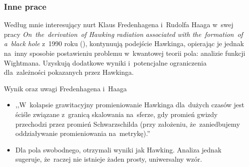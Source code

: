 \documentclass{beamer}  %
\begin{document}
\begin{frame}
  \frametitle{Inne prace}

  \begin{block}{Według mnie interesujący nurt}
    Klaus Fredenhagena i~Rudolfa Haaga w~swej pracy
    \emph{On~the~derivation~of Hawking radiation associated with
      the~formation~of a~black hole} z~1990 roku
    (\cite{FredenhagenHaagDerivationOfHawkingRadiation1990}),
    kontynuują podejście Hawkinga, opierając je jednak na~inny
    sposobie postawieniu problemu w~kwantowej teorii pola: analizie
    funkcji Wightmana. Uzyskują dodatkowe wyniki i~potencjalne
    ograniczenia dla~zależności pokazanych przez Hawkinga.
  \end{block}

  \begin{block}{Wynik oraz uwagi Fredenhagena i~Haaga}
    \begin{itemize}
    \item ,,W~kolapsie grawitacyjny promieniowanie Hawkinga dla~dużych
      czasów jest ściśle związane z~granicą skalowania na~sferze, gdy
      promień gwizdy przechodzi przez promień Schwarzschilda (przy
      założeniu, że~zaniedbujemy oddziaływanie promieniowania
      na~metrykę).''
    \item Dla pola swobodnego, otrzymali wyniki jak Hawking. Analiza
      jednak sugeruje, że~raczej nie istnieje żaden prosty,
      uniwersalny wzór.
    \end{itemize}
  \end{block}

\end{frame}
\end{document}
